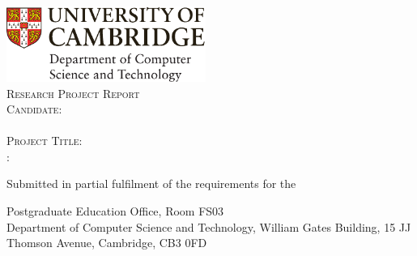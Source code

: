 \makeatletter
\hspace*{-6mm}\includegraphics[width=65mm]{Sources/Logos/logo-dcst-colour.pdf}
\\[2cm]
{\Huge \textsc{Research Project Report}}
\\[2cm]
{\Large \textsc{Candidate}: \\[0.2cm] \candidate{} }
\\[2cm]
{\Large \textsc{Project Title: } \\[0.2cm] \@title: \@subtitle}
\vfill
\begin{center}
    Submitted in partial fulfilment of the requirements for the \\[0.1cm]
    \emph{\coursethe{}} 
\end{center}
\vspace{1cm}
\begin{center}
    \footnotesize
    Postgraduate Education Office, Room FS03 \\ 
    Department of Computer Science and Technology, William Gates Building, 15 JJ Thomson Avenue, Cambridge, CB3 0FD
\end{center}
\makeatother

